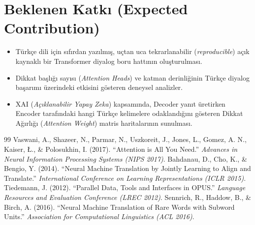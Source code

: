 \documentclass[11pt,a4paper]{article}
\begin{document}
\section{Beklenen Katkı (Expected Contribution)}
\begin{itemize}
    \item Türkçe dili için sıfırdan yazılmış, uçtan uca tekrarlanabilir (\textit{reproducible}) açık kaynaklı bir Transformer diyalog boru hattının oluşturulması.
    \item Dikkat başlığı sayısı (\textit{Attention Heads}) ve katman derinliğinin Türkçe diyalog başarımı üzerindeki etkisini gösteren deneysel analizler.
    \item XAI (\textit{Açıklanabilir Yapay Zeka}) kapsamında, Decoder yanıt üretirken Encoder tarafındaki hangi Türkçe kelimelere odaklandığını gösteren Dikkat Ağırlığı (\textit{Attention Weight}) matris haritalarının sunulması.
\end{itemize}

\begin{thebibliography}{99}
 Vaswani, A., Shazeer, N., Parmar, N., Uszkoreit, J., Jones, L., Gomez, A. N., Kaiser, Ł., \& Polosukhin, I. (2017). ``Attention is All You Need.'' \textit{Advances in Neural Information Processing Systems (NIPS 2017)}.
 Bahdanau, D., Cho, K., \& Bengio, Y. (2014). ``Neural Machine Translation by Jointly Learning to Align and Translate.'' \textit{International Conference on Learning Representations (ICLR 2015)}.
 Tiedemann, J. (2012). ``Parallel Data, Tools and Interfaces in OPUS.'' \textit{Language Resources and Evaluation Conference (LREC 2012)}.
 Sennrich, R., Haddow, B., \& Birch, A. (2016). ``Neural Machine Translation of Rare Words with Subword Units.'' \textit{Association for Computational Linguistics (ACL 2016)}.
\end{thebibliography}
\end{document}

